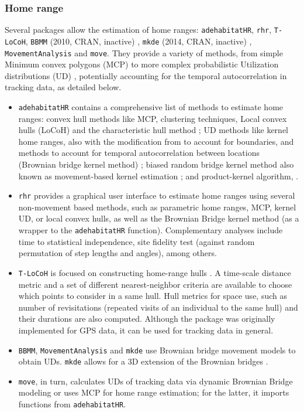 \documentclass[a4paper,12pt]{article}
\newcommand{\Rpkg}[1]{\texttt{#1}}
\begin{document}
	
	\subsubsection*{Home range}
	
	Several packages allow the estimation of home ranges: \Rpkg{adehabitatHR}, \Rpkg{rhr}, \Rpkg{T-LoCoH}, \Rpkg{BBMM} (2010, CRAN, inactive) \citep{RBBMM}, \Rpkg{mkde} (2014, CRAN, inactive) \citep{Rmkde}, \Rpkg{MovementAnalysis} and \Rpkg{move}. They provide a variety of methods, from simple Minimum convex polygons (MCP) \citep{Mohr1947} to more complex probabilistic Utilization distributions (UD) \citep{VanWinkle1975}, potentially accounting for the temporal autocorrelation in tracking data, as detailed below.
	
	\begin{itemize}
		\item \Rpkg{adehabitatHR} contains a comprehensive list of methods to estimate home ranges: convex hull methods like MCP, clustering techniques, Local convex hulls (LoCoH) \citep{Getz2007} and the characteristic hull method \cite{Downs2009}; UD methods like kernel home ranges, also with the modification from \cite{Benhamou2010} to account for boundaries, and methods to account for temporal autocorrelation between locations (Brownian bridge kernel method) \citep{Bullard1991}; biased random bridge kernel method also known as movement-based kernel estimation \citep{Benhamou2010, Benhamou2011}; and product-kernel algorithm, \cite{Horne2007}.
		\item \Rpkg{rhr} \citep{Signer2015} provides a graphical user interface to estimate home ranges using several non-movement based methods, such as parametric home ranges, MCP, kernel UD, or local convex hulls, as well as the Brownian Bridge kernel method (as a wrapper to the \Rpkg{adehabitatHR} function). Complementary analyses include time to statistical independence, site fidelity test (against random permutation of step lengths and angles), among others.
		\item \Rpkg{T-LoCoH} is focused on constructing home-range hulls \citep{Lyons2013}. A time-scale distance metric and a set of different nearest-neighbor criteria are available to choose which points to consider in a same hull. Hull metrics for space use, such as number of revisitations (repeated visits of an individual to the same hull) and their durations are also computed. Although the package was originally implemented for GPS data, it can be used for tracking data in general. 
		\item \Rpkg{BBMM}, \Rpkg{MovementAnalysis} and \Rpkg{mkde} use Brownian bridge movement models to obtain UDs. \Rpkg{mkde} allows for a 3D extension of the Brownian bridges \citep{Tracey2014}.
		\item \Rpkg{move}, in turn, calculates UDs of tracking data via dynamic Brownian Bridge modeling \citep{Kranstauber2012} or uses MCP for home range estimation; for the latter, it imports functions from \Rpkg{adehabitatHR}.
	\end{itemize}
	
\end{document}
